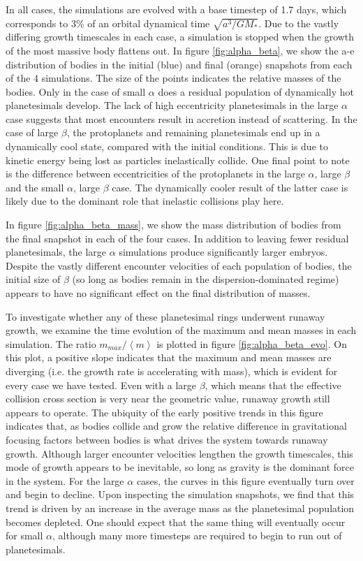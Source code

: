\documentclass[twocolumn]{aastex63}
\begin{document}
In all cases, the simulations are evolved with a base timestep of 1.7
days, which corresponds to 3\% of an orbital dynamical time
$\sqrt{a^3/G M_{*}}$. Due to the vastly differing growth timescales in
each case, a simulation is stopped when the growth of the most massive
body flattens out. In figure \ref{fig:alpha_beta}, we show the a-e
distribution of bodies in the initial (blue) and final (orange)
snapshots from each of the 4 simulations. The size of the points
indicates the relative masses of the bodies. Only in the case of small
$\alpha$ does a residual population of dynamically hot planetesimals
develop. The lack of high eccentricity planetesimals in the large
$\alpha$ case suggests that most encounters result in accretion
instead of scattering. In the case of large $\beta$, the protoplanets
and remaining planetesimals end up in a dynamically cool state,
compared with the initial conditions. This is due to kinetic energy 
being lost as particles inelastically collide. One final point to note 
is the difference between eccentricities of the protoplanets in the 
large $\alpha$, large $\beta$ and the small $\alpha$,
large $\beta$ case. The dynamically cooler result of the latter case
is likely due to the dominant role that inelastic collisions play here.

In figure \ref{fig:alpha_beta_mass}, we show the mass distribution of bodies from the final snapshot in each of the four cases. In addition to leaving fewer residual planetesimals, the large $\alpha$ simulations produce significantly larger embryos. Despite the vastly different encounter velocities of each population of bodies, the initial size of $\beta$ (so long as bodies remain in the dispersion-dominated regime) appears to have no significant effect on the final distribution of masses.

To investigate whether any of these planetesimal rings underwent
runaway growth, we examine the time evolution of the maximum and mean
masses in each simulation. The ratio $m_{max}/\left< m \right>$ is plotted
in figure \ref{fig:alpha_beta_evo}. On this plot, a positive slope
indicates that the maximum and mean masses are diverging (i.e.
the growth rate is accelerating with mass), which is
evident for every case we have tested. Even with a large
$\beta$, which means that the effective collision cross section is
very near the geometric value, runaway growth still appears to
operate. The ubiquity of the early positive trends in this figure indicates
that, as bodies collide and grow the
relative difference in gravitational focusing factors between bodies
is what drives the system towards runaway
growth. Although larger encounter velocities lengthen the growth
timescales, this mode of growth appears to be inevitable, so long as
gravity is the dominant force in the system. For the large $\alpha$
cases, the curves in this figure eventually turn over and begin to decline.
Upon inspecting the simulation snapshots, we find that this trend is
driven by an increase in the average mass as the planetesimal population
becomes depleted. One should expect that the same thing will eventually
occur for small $\alpha$, although many more timesteps are required to
begin to run out of planetesimals.
\end{document}
